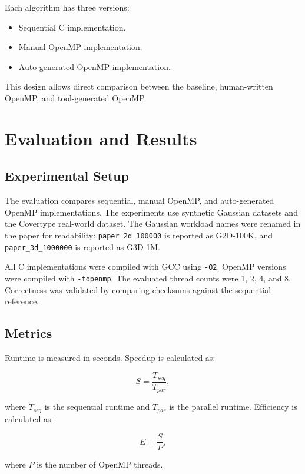 \documentclass[conference,10pt]{IEEEtran}
\begin{document}
Each algorithm has three versions:
\begin{itemize}
    \item Sequential C implementation.
    \item Manual OpenMP implementation.
    \item Auto-generated OpenMP implementation.
\end{itemize}

This design allows direct comparison between the baseline, human-written OpenMP, and tool-generated OpenMP.

\section{Evaluation and Results}

\subsection{Experimental Setup}

The evaluation compares sequential, manual OpenMP, and auto-generated OpenMP implementations. The experiments use synthetic Gaussian datasets and the Covertype real-world dataset. The Gaussian workload names were renamed in the paper for readability: \texttt{paper\_2d\_100000} is reported as G2D-100K, and \texttt{paper\_3d\_1000000} is reported as G3D-1M.

All C implementations were compiled with GCC using \texttt{-O2}. OpenMP versions were compiled with \texttt{-fopenmp}. The evaluated thread counts were 1, 2, 4, and 8. Correctness was validated by comparing checksums against the sequential reference.

\subsection{Metrics}

Runtime is measured in seconds. Speedup is calculated as:

\begin{equation}
S = \frac{T_{seq}}{T_{par}},
\end{equation}

where $T_{seq}$ is the sequential runtime and $T_{par}$ is the parallel runtime. Efficiency is calculated as:

\begin{equation}
E = \frac{S}{P},
\end{equation}

where $P$ is the number of OpenMP threads.
\end{document}
